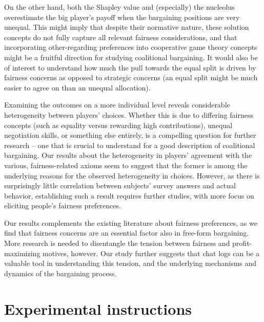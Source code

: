 \documentclass[12pt]{article}
\begin{document}
On the other hand, both the Shapley value and (especially) the nucleolus overestimate the big player's payoff when the bargaining positions are very unequal. This might imply that despite their normative nature, these solution concepts do not fully capture all relevant fairness considerations, and that incorporating other-regarding preferences into cooperative game theory concepts might be a fruitful direction for studying coalitional bargaining. It would also be of interest to understand how much the pull towards the equal split is driven by fairness concerns as opposed to strategic concerns (an equal split might be much easier to agree on than an unequal allocation).

Examining the outcomes on a more individual level reveals considerable heterogeneity between players' choices. Whether this is due to differing fairness concepts (such as equality versus rewarding high contributions), unequal negotiation skills, or something else entirely, is a compelling question for further research -- one that is crucial to understand for a good description of coalitional bargaining. Our results about the heterogeneity in players' agreement with the various, fairness-related axioms seem to suggest that the former is among the underlying reasons for the observed heterogeneity in choices. However, as there is surprisingly little correlation between subjects' survey answers and actual behavior, establishing such a result requires further studies, with more focus on eliciting people's fairness preferences.

Our results complements the existing literature about fairness preferences, as we find that fairness concerns are an essential factor also in free-form bargaining. More research is needed to disentangle the tension between fairness and profit-maximizing motives, however. Our study further suggests that chat logs can be a valuable tool in understanding this tension, and the underlying mechanisms and dynamics of the bargaining process.



\newpage
\printbibliography

\newpage
\appendix


\section{Experimental instructions} \label{subsec:instructions}
\end{document}
